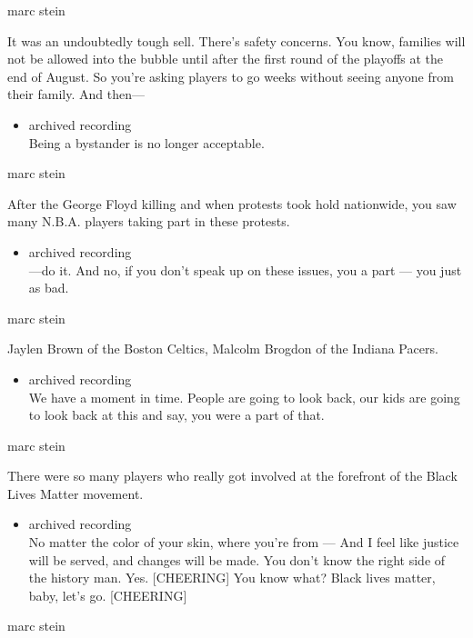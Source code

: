 marc stein

It was an undoubtedly tough sell. There's safety concerns. You know,
families will not be allowed into the bubble until after the first round
of the playoffs at the end of August. So you're asking players to go
weeks without seeing anyone from their family. And then---

\begin{itemize}
\tightlist
\item
  archived recording\\
  Being a bystander is no longer acceptable.
\end{itemize}

marc stein

After the George Floyd killing and when protests took hold nationwide,
you saw many N.B.A. players taking part in these protests.

\begin{itemize}
\tightlist
\item
  archived recording\\
  ---do it. And no, if you don't speak up on these issues, you a part
  --- you just as bad.
\end{itemize}

marc stein

Jaylen Brown of the Boston Celtics, Malcolm Brogdon of the Indiana
Pacers.

\begin{itemize}
\tightlist
\item
  archived recording\\
  We have a moment in time. People are going to look back, our kids are
  going to look back at this and say, you were a part of that.
\end{itemize}

marc stein

There were so many players who really got involved at the forefront of
the Black Lives Matter movement.

\begin{itemize}
\tightlist
\item
  archived recording\\
  No matter the color of your skin, where you're from --- And I feel
  like justice will be served, and changes will be made. You don't know
  the right side of the history man. Yes. {[}CHEERING{]} You know what?
  Black lives matter, baby, let's go. {[}CHEERING{]}
\end{itemize}

marc stein

